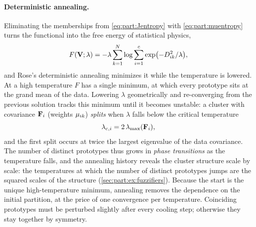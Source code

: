 \paragraph{Deterministic annealing.} Eliminating the memberships from \eqref{eq:part:Jentropy} with \eqref{eq:part:muentropy} turns the functional into the free energy of statistical physics,
\begin{equation}
  F(\mathbf{V};\lambda)=-\lambda\sum_{k=1}^{N}\log\sum_{i=1}^{c}\exp\bigl(-D^2_{ik}/\lambda\bigr),
  \label{eq:part:freeenergy}
\end{equation}
and Rose's deterministic annealing \cite{rose:1998:annealing} minimizes it while the temperature is lowered. At a high temperature $F$ has a single minimum, at which every prototype sits at the grand mean of the data. Lowering $\lambda$ geometrically and re-converging from the previous solution tracks this minimum until it becomes unstable: a cluster with covariance $\mathbf{F}_i$ (weights $\mu_{ik}$) \emph{splits} when $\lambda$ falls below the critical temperature
\begin{equation}
  \lambda_{c,i}=2\,\lambda_{\max}(\mathbf{F}_i),
  \label{eq:part:critical}
\end{equation}
and the first split occurs at twice the largest eigenvalue of the data covariance. The number of distinct prototypes thus grows in \emph{phase transitions} as the temperature falls, and the annealing history reveals the cluster structure scale by scale: the temperatures at which the number of distinct prototypes jumps are the squared scales of the structure (\cref{sec:part:ex:fuzzifiers}). Because the start is the unique high-temperature minimum, annealing removes the dependence on the initial partition, at the price of one convergence per temperature. Coinciding prototypes must be perturbed slightly after every cooling step; otherwise they stay together by symmetry.


